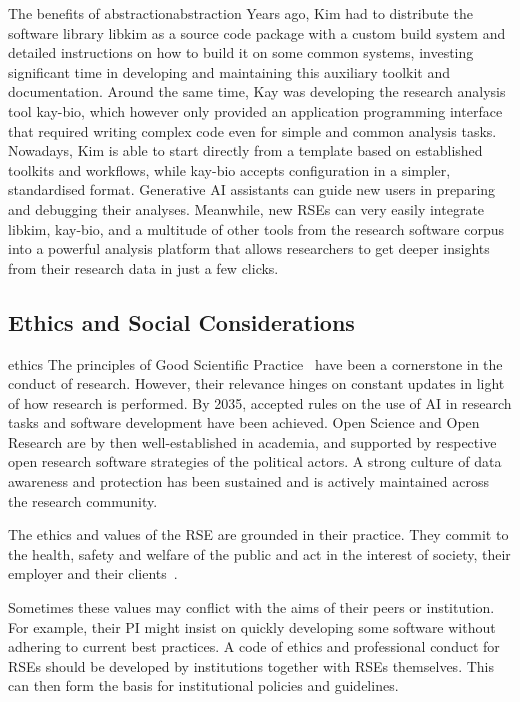\documentclass{eceasst}
\begin{document}
\begin{story}{The benefits of abstraction}{abstraction}
Years ago, Kim had to distribute the software library libkim as a source code package
with a custom build system and detailed instructions on how to build it on some common systems,
investing significant time in developing and maintaining this auxiliary toolkit and documentation.
Around the same time, Kay was developing the research analysis tool kay-bio,
which however only provided an application programming interface that
required writing complex code even for simple and common analysis tasks.
Nowadays, Kim is able to start directly from a template based on established toolkits and workflows,
while kay-bio accepts configuration in a simpler, standardised format.
Generative AI assistants can guide new users in preparing and debugging their analyses.
Meanwhile, new RSEs can very easily integrate libkim, kay-bio, and a multitude
of other tools from the research software corpus into a powerful analysis
platform that allows researchers to get deeper insights from their research data
in just a few clicks.
\end{story}

\subsection{Ethics and Social Considerations}
\begin{whatis}{}{ethics}
The principles of Good Scientific Practice~\cite{dfg_gsp} have been a cornerstone in the conduct of research.
However, their relevance hinges on constant updates in light of how research is performed.
By 2035, accepted rules on the use of AI in research tasks and software development have been achieved.
Open Science and Open Research are by then well-established in academia, and supported by respective open research software
strategies of the political actors.
A strong culture of data awareness and protection has been sustained and is actively maintained across the research community.
\end{whatis}

The ethics and values of the RSE are grounded in their practice.
They commit to the health, safety and welfare of the public and act in the interest of society, their employer and their clients~\cite{Goth2024}.

Sometimes these values may conflict with the aims of their peers or institution.
For example, their PI might insist on quickly developing some software without adhering to current best practices.
A code of ethics and professional conduct for RSEs should be developed by institutions together with RSEs themselves.
This can then form the basis for institutional policies and guidelines.
\end{document}

